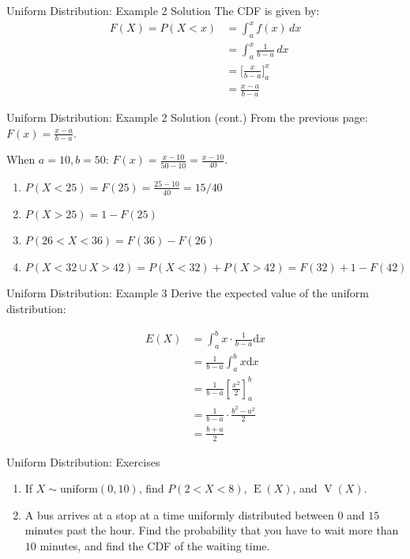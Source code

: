 \documentclass[12pt, aspectratio=169]{beamer}
\DeclareMathOperator{\E}{E}
\DeclareMathOperator{\V}{V}
\begin{document}
	\begin{frame}{Uniform Distribution: Example 2 Solution}
		The CDF is given by:
		\begin{align*}
			F(X) = P(X < x) &= \int_{a}^{x} f(x) \, dx \\
			&= \int_{a}^{x} \frac{1}{b-a} \, dx \\
			&= \Big[\frac{x}{b-a}\Big]_a^x \\
			&= \frac{x-a}{b-a}
		\end{align*}
	\end{frame}


	\begin{frame}{Uniform Distribution: Example 2 Solution (cont.)}
		From the previous page: \(F(x) = \frac{x-a}{b-a}.\)

		\vspace{0.5em}

		When \(a = 10, b = 50\): \(F(x) = \frac{x-10}{50-10} = \frac{x-10}{40}.\)

		\begin{enumerate}
			\item \(P(X < 25) = F(25) = \frac{25-10}{40} = 15/40\)
			\item \(P(X > 25) = 1 - F(25)\)
			\item \(P(26 < X < 36) = F(36) - F(26)\)
			\item \(P(X < 32 \cup X > 42) = P(X < 32) + P(X > 42) = F(32) + 1 - F(42)\)
		\end{enumerate}
	\end{frame}

	
	\begin{frame}{Uniform Distribution: Example 3}
		Derive the expected value of the uniform distribution:

		\begin{align*}
			E(X) &= \int_{a}^{b} x \cdot \frac{1}{b-a} \mathrm{d}x \\
			     &= \frac{1}{b-a} \int_{a}^{b} x \mathrm{d}x \\
				 &= \frac{1}{b-a} \left[\frac{x^2}{2}\right]_a^b \\
				 &= \frac{1}{b-a} \cdot \frac{b^2 - a^2}{2} \\
				 &= \frac{b+a}{2}
		\end{align*}
		
	\end{frame}


	\begin{frame}{Uniform Distribution: Exercises}
		\begin{enumerate}
			\item If \(X \sim \mathrm{uniform}(0, 10)\), find \(P(2 < X < 8)\), \(\E(X)\), and \(\V(X)\).
			\item A bus arrives at a stop at a time uniformly distributed between \(0\) and \(15\) minutes past the hour. Find the probability that you have to wait more than \(10\) minutes, and find the CDF of the waiting time.
		\end{enumerate}
	\end{frame}
\end{document}
